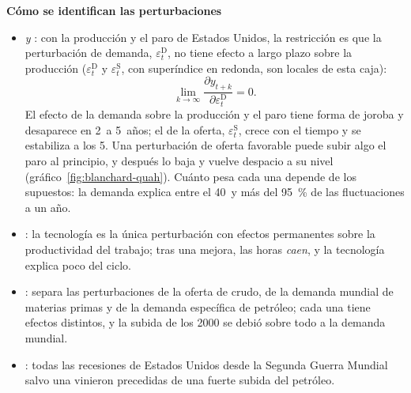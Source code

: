 \documentclass[11pt]{article}
\begin{document}
\begin{anotaciones}
\textbf{Cómo se identifican las perturbaciones}
\begin{itemize}
\item \emph{ y }: con la producción y el paro de Estados Unidos, la restricción es que la perturbación de demanda, $\varepsilon^{\mathrm D}_t$, no tiene efecto a largo plazo sobre la producción ($\varepsilon^{\mathrm D}_t$ y $\varepsilon^{\mathrm S}_t$, con superíndice en redonda, son locales de esta caja):
  \begin{equation}
  \lim_{k\to\infty}\frac{\partial y_{t+k}}{\partial\varepsilon^{\mathrm D}_t}=0 . \label{eq:blanchard-quah}
  \end{equation}
  El efecto de la demanda sobre la producción y el paro tiene forma de joroba y desaparece en 2~a 5~años; el de la oferta, $\varepsilon^{\mathrm S}_t$, crece con el tiempo y se estabiliza a los 5. Una perturbación de oferta favorable puede subir algo el paro al principio, y después lo baja y vuelve despacio a su nivel (gráfico~\ref{fig:blanchard-quah}). Cuánto pesa cada una depende de los supuestos: la demanda explica entre el 40~y más del 95~\% de las fluctuaciones a un año\nocite{BlanchardQuah1989}.
\begin{figuracaja}
\centering
\caption{Las respuestas a una perturbación de demanda y a una de oferta en el modelo de  y }\label{fig:blanchard-quah}
\end{figuracaja}
\item \emph{}: la tecnología es la única perturbación con efectos permanentes sobre la productividad del trabajo; tras una mejora, las horas \emph{caen}, y la tecnología explica poco del ciclo\nocite{Gali1999Technology}.
\item \emph{}: separa las perturbaciones de la oferta de crudo, de la demanda mundial de materias primas y de la demanda específica de petróleo; cada una tiene efectos distintos, y la subida de los 2000 se debió sobre todo a la demanda mundial\nocite{Kilian2009NotAll}.
\item \emph{}: todas las recesiones de Estados Unidos desde la Segunda Guerra Mundial salvo una vinieron precedidas de una fuerte subida del petróleo\nocite{Hamilton1983Oil}.
\end{itemize}
\end{anotaciones}
\end{document}
